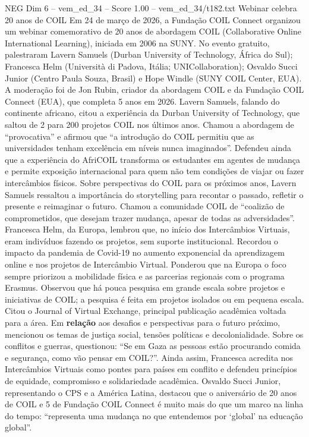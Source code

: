 \begin{textsample}{NEG Dim 6 – vem\_ed\_34 – Score 1.00 – vem\_ed\_34/t182.txt}  \label{ex:f6_neg_004}
Webinar celebra 20 anos de COIL Em 24 de março de 2026, a Fundação COIL Connect organizou um webinar comemorativo de 20 anos de abordagem COIL (Collaborative Online International Learning), iniciada em 2006 na SUNY.
No evento gratuito, palestraram Lavern Samuels (Durban University of Technology, África do Sul); Francesca Helm (Università di Padova, Itália; UNICollaboration); Osvaldo Succi Junior (Centro Paula Souza, Brasil) e Hope Windle (SUNY COIL Center, EUA).
A moderação foi de Jon Rubin, criador da abordagem COIL e da Fundação COIL Connect (EUA), que completa 5 anos em 2026.
Lavern Samuels, falando do continente africano, citou a experiência da Durban University of Technology, que saltou de 2 para 200 projetos COIL nos últimos anos.
Chamou a abordagem de “provocativa” e afirmou que “a introdução do COIL permitiu que as universidades tenham excelência em níveis nunca imaginados”.
Defendeu ainda que a experiência do AfriCOIL transforma os estudantes em agentes de mudança e permite exposição internacional para quem não tem condições de viajar ou fazer intercâmbios físicos.
Sobre perspectivas do COIL para os próximos anos, Lavern Samuels ressaltou a importância do storytelling para recontar o passado, refletir o presente e reimaginar o futuro.
Chamou a comunidade COIL de “coalizão de comprometidos, que desejam trazer mudança, apesar de todas as adversidades”.
Francesca Helm, da Europa, lembrou que, no início dos Intercâmbios Virtuais, eram indivíduos fazendo os projetos, sem suporte institucional.
Recordou o impacto da pandemia de Covid-19 no aumento exponencial da aprendizagem online e nos projetos de Intercâmbio Virtual.
Ponderou que na Europa o foco sempre priorizou a mobilidade física e as parcerias regionais com o programa Erasmus.
Observou que há pouca pesquisa em grande escala sobre projetos e iniciativas de COIL; a pesquisa é feita em projetos isolados ou em pequena escala.
Citou o Journal of Virtual Exchange, principal publicação acadêmica voltada para a área.
Em \textbf{relação} aos desafios e perspectivas para o futuro próximo, mencionou os temas de justiça social, tensões políticas e decolonialidade.
Sobre os conflitos e guerras, questionou: “Se em Gaza as pessoas estão procurando comida e segurança, como vão pensar em COIL?”.
Ainda assim, Francesca acredita nos Intercâmbios Virtuais como pontes para países em conflito e defendeu princípios de equidade, compromisso e solidariedade acadêmica.
Osvaldo Succi Junior, representando o CPS e a América Latina, destacou que o aniversário de 20 anos de COIL e 5 de Fundação COIL Connect é muito mais do que um marco na linha do tempo: “representa uma mudança no que entendemos por ‘global’ na educação global”.

\end{textsample}
